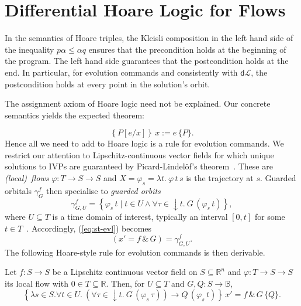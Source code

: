 \documentclass[envcountsame,envcountsect]{llncs}
\newcommand{\dL}{\mathsf{d}\mathcal{L}}
\newcommand{\flow}{\varphi}
\newcommand{\reals}{\mathbb{R}}
\newcommand{\bools}{\mathbb{B}}
\begin{document}
\section{Differential Hoare Logic for Flows}\label{sec:hoare-flow}

In the semantics of Hoare triples, the Kleisli composition in the left hand side of the inequality $p\alpha\le \alpha q$ ensures that the precondition holds at the beginning of the program. The left hand side guarantees that the postcondition holds at the end. In particular, for evolution commands and consistently with $\dL$, the postcondition holds at every point in the solution's orbit.

The assignment axiom of Hoare logic need not be explained. Our concrete
semantics yields the expected theorem:

\begin{equation}
\left\{P[e/x]\right\}\,  x:=e\, \{P\}. \label{eq:h-assgn}\tag{h-assgn}
\end{equation}
Hence all we need to add to Hoare logic is a rule for evolution
commands.  We restrict our attention to Lipschitz-continuous vector
fields for which unique solutions to IVPs are guaranteed by
Picard-Lindel\"of's theorem~\cite{Teschl12}.  These are \emph{(local)\
  flows} $\flow:T\to S\to S$ and $X=\flow_s=\lambda t.\ \flow\, t\, s$
is the trajectory at $s$. Guarded orbitals $\gamma^f_G$ then
specialise to \emph{guarded orbits}
\begin{equation*}
  \gamma^f_{G,U} = \left\{\flow_s\, t\mid t\in U\land \forall\tau \in
  {\downarrow}t.\ G\, (\flow_s\, t)\right\},
\end{equation*}
where $U\subseteq T$ is a time domain of interest, typically an
interval $[0,t]$ for some $t\in T$~\cite{MuniveS19}.  Accordingly,
(\ref{eq:st-evl}) becomes
\begin{equation}
  \left(x' = f\, \&\, G\right)= \gamma^f_{G,U}.\label{eq:st-evl-flow}\tag{st-evl-flow}
\end{equation}
The following Hoare-style rule for evolution commands is then
derivable.
\begin{lemma}\label{P:h-evl-lemma}
  Let $f:S\to S$ be a Lipschitz continuous vector field on
  $S\subseteq \reals^n$ and $\flow:T\to S\to S$ its local flow with
  $0\in T\subseteq \reals$. Then, for $U\subseteq T$ and
  $G,Q:S\to\bools$,
\begin{equation}
\left\{\lambda s\in S.\forall t\in U.\ \left(\forall
\tau\in {\downarrow}t.\ G\, (\flow_s\, \tau)\right) \rightarrow Q\,
(\flow_s\, t)\right\}\, x' = f\, \&\, G\, \{Q\}. \label{eq:h-evl}\tag{h-evl}
\end{equation}
\end{lemma}
\end{document}
